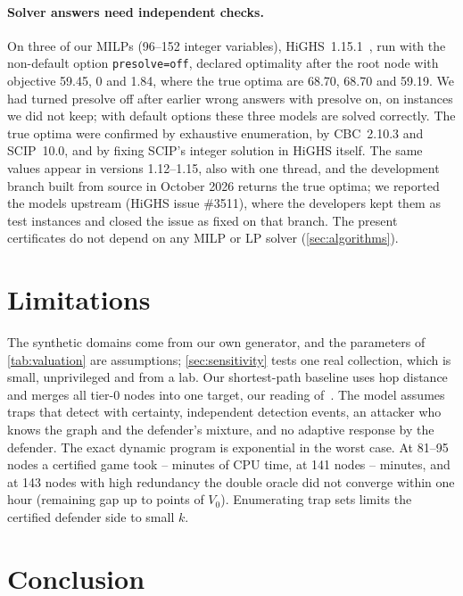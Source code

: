 \documentclass[runningheads]{llncs}
\begin{document}
\paragraph{Solver answers need independent checks.}
On three of our MILPs (96--152 integer variables), HiGHS~1.15.1~\cite{huangfu2018parallelizing}, run with the non-default option \texttt{presolve=off}, declared optimality after the root node with objective 59.45, 0 and 1.84, where the true optima are 68.70, 68.70 and 59.19. We had turned presolve off after earlier wrong answers with presolve on, on instances we did not keep; with default options these three models are solved correctly. The true optima were confirmed by exhaustive enumeration, by CBC~2.10.3 and SCIP~10.0, and by fixing SCIP's integer solution in HiGHS itself. The same values appear in versions 1.12--1.15, also with one thread, and the development branch built from source in October 2026 returns the true optima; we reported the models upstream (HiGHS issue \#3511), where the developers kept them as test instances and closed the issue as fixed on that branch. The present certificates do not depend on any MILP or LP solver (\cref{sec:algorithms}).

\section{Limitations}

The synthetic domains come from our own generator, and the parameters of \cref{tab:valuation} are assumptions; \cref{sec:sensitivity} tests one real collection, which is small, unprivileged and from a lab. Our shortest-path baseline uses hop distance and merges all tier-0 nodes into one target, our reading of~\cite{ngo2024catch}. The model assumes traps that detect with certainty, independent detection events, an attacker who knows the graph and the defender's mixture, and no adaptive response by the defender. The exact dynamic program is exponential in the worst case. At 81--95 nodes a certified game took \TcpuMainMin--\TcpuMainMax{} minutes of CPU time, at 141 nodes \TcpuBigMin--\TcpuBigMax{} minutes, and at 143 nodes with high redundancy the double oracle did not converge within one hour (remaining gap up to \AltaGapMax{} points of $V_0$). Enumerating trap sets limits the certified defender side to small $k$.

\section{Conclusion}
\end{document}
